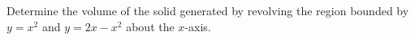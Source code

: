 \question[10] Determine the volume of the solid generated by revolving the region bounded by $y = x^2$ and $y = 2x - x^2$ about the $x$-axis.

